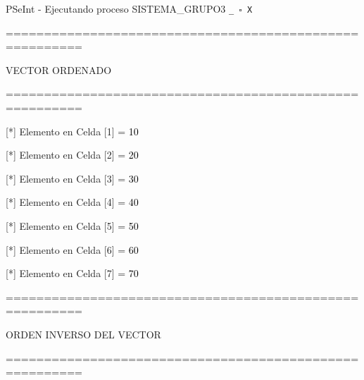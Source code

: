 \documentclass[12pt,a4paper]{article}
\newcommand{\consola}[1]{\noindent\textcolor{pseString}{#1}}
\newcommand{\entrada}[1]{\textcolor{black}{#1}}
\newenvironment{PSeIntWindow}{%
	\begin{tcolorbox}[
		breakable,
		enhanced,
		colback=white,
		colframe=black!60,
		boxrule=0.5pt,
		arc=1mm,
		left=0mm,
		right=0mm,
		top=0mm,
		bottom=2mm,
		width=\textwidth
		]
	}{%
	\end{tcolorbox}
}
\newcommand{\BarraPSeInt}{%
	\colorbox{gray!20}{%
		\parbox{\dimexpr\textwidth-2\fboxsep\relax}{%
			\small
			\textcolor{pseString}{\faPlayCircle}
			\hspace{0.3em}
			PSeInt - Ejecutando proceso SISTEMA\_GRUPO3
			\hfill
			\texttt{\_ \hspace{0.5em} \(\square\) \hspace{0.5em} X}
		}
	}
}
\begin{document}
\begin{PSeIntWindow}
	
	\BarraPSeInt
	
	\vspace{0.2cm}
	
	\ttfamily\small
	
	\consola{========================================================}\par
	
	\vspace{0.2cm}
	
	\consola{VECTOR ORDENADO}\par
	
	\vspace{0.2cm}
	
	\consola{========================================================}\par
	
	\vspace{0.3cm}
	
	\consola{[*] Elemento en Celda [1] = }\entrada{10}\par
	
	\consola{[*] Elemento en Celda [2] = }\entrada{20}\par
	
	\consola{[*] Elemento en Celda [3] = }\entrada{30}\par
	
	\consola{[*] Elemento en Celda [4] = }\entrada{40}\par
	
	\consola{[*] Elemento en Celda [5] = }\entrada{50}\par
	
	\consola{[*] Elemento en Celda [6] = }\entrada{60}\par
	
	\consola{[*] Elemento en Celda [7] = }\entrada{70}\par
	
	\vspace{0.3cm}
	
	\consola{========================================================}\par
	
	\vspace{0.3cm}
	
	\consola{ORDEN INVERSO DEL VECTOR}\par
	
	\vspace{0.2cm}
	
	\consola{========================================================}\par
	

\end{PSeIntWindow}
\end{document}
